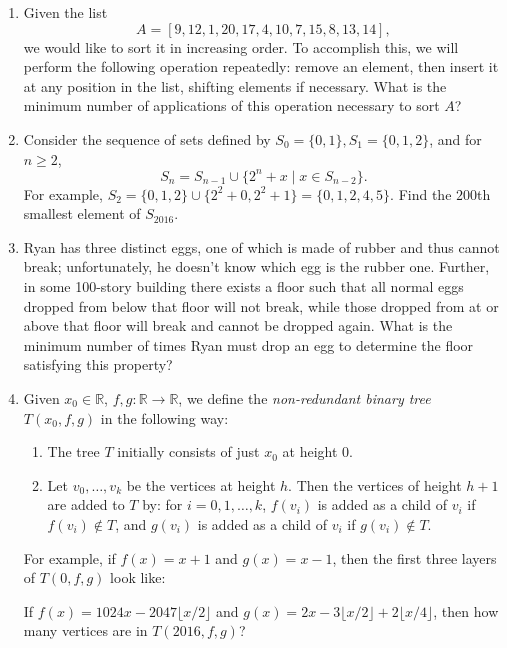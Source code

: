 \documentclass[10pt]{article}
\begin{document}
\begin{enumerate}
\item Given the list \[A=[9,12,1,20,17,4,10,7,15,8,13,14],\] we would like to sort it in increasing order.  To accomplish this, we will perform the following operation repeatedly: remove an element, then insert it at any position in the list, shifting elements if necessary.  What is the minimum number of applications of this operation necessary to sort $A$?

\item Consider the sequence of sets defined by $S_0=\{0,1\},S_1=\{0,1,2\}$, and for $n\ge2$, \[S_n=S_{n-1}\cup\{2^n+x\mid x\in S_{n-2}\}.\] For example, $S_2=\{0,1,2\}\cup\{2^2+0,2^2+1\}=\{0,1,2,4,5\}$. Find the $200$th smallest element of $S_{2016}$.

\item Ryan has three distinct eggs, one of which is made of rubber and thus cannot break; unfortunately, he doesn't know which egg is the rubber one. Further, in some 100-story building there exists a floor such that all normal eggs dropped from below that floor will not break, while those dropped from at or above that floor will break and cannot be dropped again. What is the minimum number of times Ryan must drop an egg to determine the floor satisfying this property?

\item Given $x_0\in\mathbb R$, $f,g:\mathbb R\to\mathbb R$, we define the \emph{non-redundant binary tree} $T(x_0,f,g)$ in the following way:

\begin{enumerate}
\item The tree $T$ initially consists of just $x_0$ at height $0$.

\item Let $v_0,\dots,v_k$ be the vertices at height $h$. Then the vertices of height $h+1$ are added to $T$ by: for $i=0,1,\dots,k$, $f(v_i)$ is added as a child of $v_i$ if $f(v_i)\not\in T$, and $g(v_i)$ is added as a child of $v_i$ if $g(v_i)\not\in T$.
\end{enumerate}

For example, if $f(x)=x+1$ and $g(x)=x-1$, then the first three layers of $T(0,f,g)$ look like:

\begin{center}
\end{center}

If $f(x)=1024x-2047\lfloor x/2\rfloor$ and $g(x)=2x-3\lfloor x/2\rfloor+2\lfloor x/4\rfloor$, then how many vertices are in $T(2016,f,g)$?
\end{enumerate}
\end{document}
